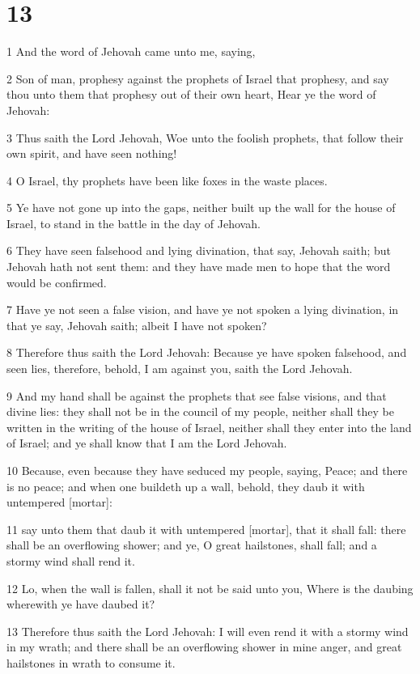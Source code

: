 \chapter{13}

\par 1 And the word of Jehovah came unto me, saying,
\par 2 Son of man, prophesy against the prophets of Israel that prophesy, and say thou unto them that prophesy out of their own heart, Hear ye the word of Jehovah:
\par 3 Thus saith the Lord Jehovah, Woe unto the foolish prophets, that follow their own spirit, and have seen nothing!
\par 4 O Israel, thy prophets have been like foxes in the waste places.
\par 5 Ye have not gone up into the gaps, neither built up the wall for the house of Israel, to stand in the battle in the day of Jehovah.
\par 6 They have seen falsehood and lying divination, that say, Jehovah saith; but Jehovah hath not sent them: and they have made men to hope that the word would be confirmed.
\par 7 Have ye not seen a false vision, and have ye not spoken a lying divination, in that ye say, Jehovah saith; albeit I have not spoken?
\par 8 Therefore thus saith the Lord Jehovah: Because ye have spoken falsehood, and seen lies, therefore, behold, I am against you, saith the Lord Jehovah.
\par 9 And my hand shall be against the prophets that see false visions, and that divine lies: they shall not be in the council of my people, neither shall they be written in the writing of the house of Israel, neither shall they enter into the land of Israel; and ye shall know that I am the Lord Jehovah.
\par 10 Because, even because they have seduced my people, saying, Peace; and there is no peace; and when one buildeth up a wall, behold, they daub it with untempered [mortar]:
\par 11 say unto them that daub it with untempered [mortar], that it shall fall: there shall be an overflowing shower; and ye, O great hailstones, shall fall; and a stormy wind shall rend it.
\par 12 Lo, when the wall is fallen, shall it not be said unto you, Where is the daubing wherewith ye have daubed it?
\par 13 Therefore thus saith the Lord Jehovah: I will even rend it with a stormy wind in my wrath; and there shall be an overflowing shower in mine anger, and great hailstones in wrath to consume it.
